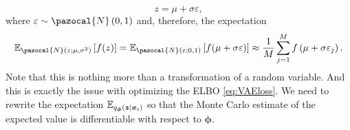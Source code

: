 \begin{equation}\label{eq:VAE_reparam1D}
z = \mu + \sigma\varepsilon,
\end{equation}
where $\varepsilon\sim\pazocal{N}\left(0,1\right)$ and, therefore, the expectation
\begin{equation}
    \mathbb{E}_{\pazocal{N}\left(z;\mu, \sigma^2\right)}\left[f(z)\right] = \mathbb{E}_{\pazocal{N}\left(\varepsilon;0, 1\right)}\left[f(\mu + \sigma\varepsilon)\right] \approx \frac{1}{M}\sum_{j=1}^M f\left(\mu + \sigma\varepsilon_j\right).
\end{equation}
Note that this is nothing more than a transformation of a random variable. And this is exactly the issue with optimizing the ELBO \eqref{eq:VAEloss}. We need to rewrite the expectation $\mathbb{E}_{q_{\boldsymbol{\phi}}\left(\boldsymbol{z}\vert\boldsymbol{x}_i \right)}$ so that the Monte Carlo estimate of the expected value is differentiable with respect to $\boldsymbol{\phi}$.

